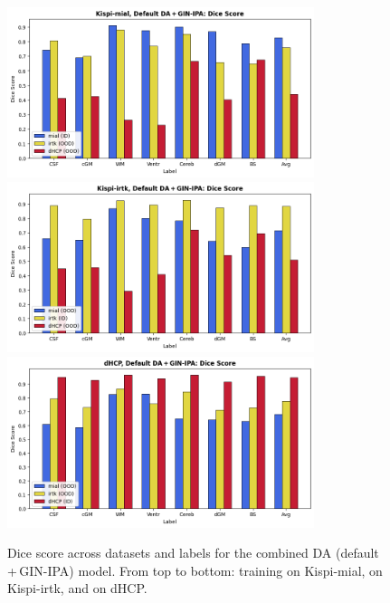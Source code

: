 \begin{figure}[htbp]
  \centering
  \includegraphics[width=0.8\textwidth]{figures/mial_both_DC.png} \\
  \vspace{10pt}
  \includegraphics[width=0.8\textwidth]{figures/irtk_both_DC.png} \\
  \vspace{10pt}
  \includegraphics[width=0.8\textwidth]{figures/dHCP_both_DC.png}
  \caption{Dice score across datasets and labels for the combined DA (default\,+\,GIN-IPA) model. From top to bottom: training on Kispi-mial, on Kispi-irtk, and on dHCP.}
  \label{fig:both_DC}
\end{figure}

